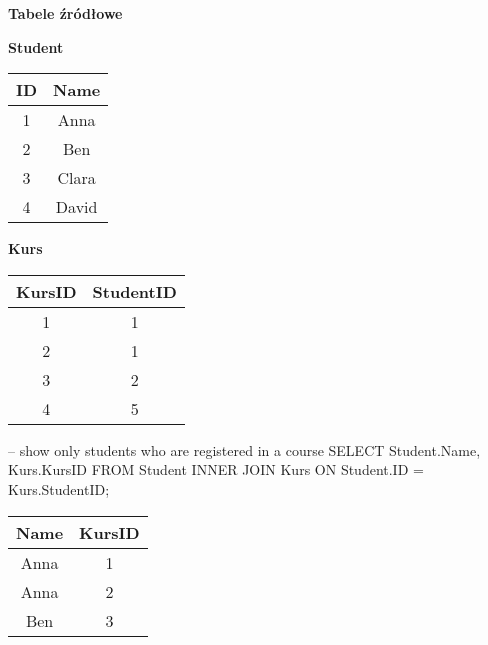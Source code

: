 \begin{table}[H]
    \centering
    \textbf{Tabele źródłowe} \\ [10pt]
    \begin{minipage}[t]{0.4\textwidth}
        \centering
        \textbf{Student} \\[3pt]
        \begin{tabular}{|c|c|}
            \hline
            \textbf{ID} & \textbf{Name} \\
            \hline
            1 & Anna \\
            2 & Ben \\
            3 & Clara \\
            4 & David \\ %
            \hline
        \end{tabular}
    \end{minipage}
    \hspace{0.3cm}
    \begin{minipage}[t]{0.4\textwidth}
        \centering
        \textbf{Kurs} \\ [3pt]
        \begin{tabular}{|c|c|}
            \hline
            \textbf{KursID} & \textbf{StudentID} \\
            \hline
            1 & 1 \\
            2 & 1 \\
            3 & 2 \\
            4 & 5 \\ %
            \hline
        \end{tabular}
    \end{minipage}
\end{table}

\begin{sql}
-- show only students who are registered in a course
SELECT Student.Name, Kurs.KursID
    FROM Student
    INNER JOIN Kurs ON Student.ID = Kurs.StudentID;
\end{sql}

\begin{center}
\begin{tabular}{|c|c|}
    \hline
    \textbf{Name} & \textbf{KursID} \\
    \hline
    Anna  & 1 \\
    Anna  & 2 \\
    Ben   & 3 \\
    \hline
\end{tabular}
\end{center}

